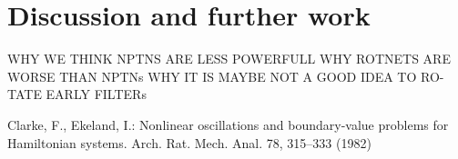 \documentclass{llncs}
\begin{document}
\section{Discussion and further work}
WHY WE THINK NPTNS ARE LESS POWERFULL WHY ROTNETS ARE
WORSE THAN NPTNs WHY IT IS MAYBE NOT A GOOD IDEA TO RO-
TATE EARLY FILTERs
%
%
\begin{thebibliography}{}
%
Clarke, F., Ekeland, I.:
Nonlinear oscillations and
boundary-value problems for Hamiltonian systems.
Arch. Rat. Mech. Anal. 78, 315--333 (1982)

\end{thebibliography}
%
\end{document}
